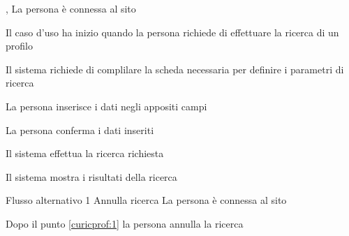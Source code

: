 \tabcuvspace

%

{, }
{La persona è connessa al sito}
{\postNulle}
{\begin{enumCU}
	\item Il caso d'uso ha inizio quando la persona richiede di effettuare la ricerca di un profilo
	\item Il sistema richiede di complilare la scheda necessaria per definire i parametri di ricerca
	\item La persona inserisce i dati negli appositi campi \label{curicprof:1}
	\item La persona conferma i dati inseriti
	\item Il sistema effettua la ricerca richiesta
	\item Il sistema mostra i risultati della ricerca
\end{enumCU}}
%
{Flusso alternativo 1}%
{Annulla ricerca}%
{La persona è connessa al sito}%
{\postNulle}%
{\begin{enumCU}
		\item Dopo il punto \ref{curicprof:1} la persona annulla la ricerca
	\end{enumCU}}%

\tabcuvspace

%

